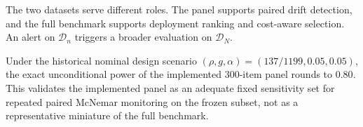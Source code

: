 The two datasets serve different roles. The panel supports paired drift detection, and the full benchmark supports deployment ranking and cost-aware selection. An alert on \(\mathcal{D}_n\) triggers a broader evaluation on \(\mathcal{D}_N\).

Under the historical nominal design scenario \((\rho,g,\alpha)=(137/1199,0.05,0.05)\), the exact unconditional power of the implemented 300-item panel rounds to \(0.80\). This validates the implemented panel as an adequate fixed sensitivity set for repeated paired McNemar monitoring on the frozen subset, not as a representative miniature of the full benchmark.